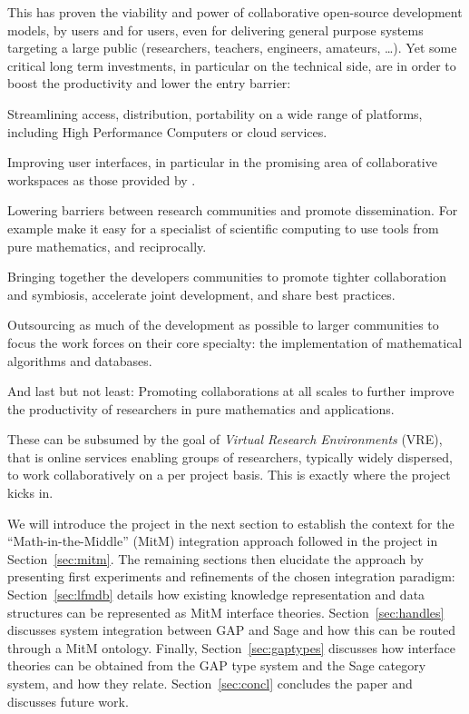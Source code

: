 This has proven the viability and power of collaborative open-source development models,
by users and for users, even for delivering general purpose systems targeting a large
public (researchers, teachers, engineers, amateurs, \ldots). Yet some critical long term
investments, in particular on the technical side, are in order to boost the productivity
and lower the entry barrier:
\begin{compactitem}
\item Streamlining access, distribution, portability on a wide range of platforms, including
  High Performance Computers or cloud services.
\item Improving user interfaces, in particular in the promising area of collaborative
  workspaces as those provided by \SMC.
\item Lowering barriers between research communities and promote dissemination. For example
  make it easy for a specialist of scientific computing to use tools from pure
  mathematics, and reciprocally.
\item Bringing together the developers communities to promote tighter collaboration and
  symbiosis, accelerate joint development, and share best practices.
\item Outsourcing as much of the development as possible to larger communities to focus
  the work forces on their core specialty: the implementation of mathematical algorithms
  and databases.
\item And last but not least: Promoting collaborations at all scales to further improve
  the productivity of researchers in pure mathematics and applications.
\end{compactitem}
These can be subsumed by the goal of \emph{Virtual Research Environments} (VRE), that is
online services enabling groups of researchers, typically widely dispersed, to work
collaboratively on a per project basis. This is exactly where the \ODK project kicks in. 

We will introduce the \ODK project in the next section to establish the context for the
``Math-in-the-Middle'' (MitM) integration approach followed in the project in
Section~\ref{sec:mitm}. The remaining sections then elucidate the approach by presenting
first experiments and refinements of the chosen integration paradigm:
Section~\ref{sec:lfmdb} details how existing knowledge representation and data structures
can be represented as MitM interface theories. Section~\ref{sec:handles} discusses system
integration between GAP and Sage and how this can be routed through a MitM
ontology. Finally, Section~\ref{sec:gaptypes} discusses how interface theories can be
obtained from the GAP type system and the Sage category system, and how they
relate. Section~\ref{sec:concl} concludes the paper and discusses future work.





